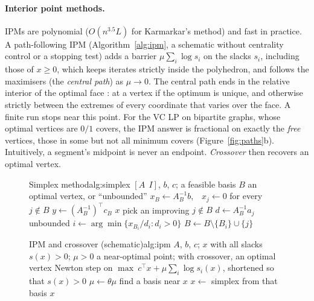 \paragraph{Interior point methods.} IPMs \cite{karmarkar1984} are polynomial ($O(n^{3.5}L)$ for Karmarkar's method) and fast in practice. A path-following IPM (Algorithm~\ref{alg:ipm}, a schematic without centrality control or a stopping test) adds a barrier $\mu\sum_i\log s_i$ on the slacks $s_i$, including those of $x\ge0$, which keeps iterates strictly inside the polyhedron, and follows the maximisers (the \emph{central path}) as $\mu\to0$. The central path ends in the relative interior of the optimal face \cite{guler1993}: at a vertex if the optimum is unique, and otherwise strictly between the extremes of every coordinate that varies over the face. A finite run stops near this point. For the VC LP on bipartite graphs, whose optimal vertices are $0/1$ covers, the IPM answer is fractional on exactly the \emph{free} vertices, those in some but not all minimum covers (Figure~\ref{fig:paths}b). Intuitively, a segment's midpoint is never an endpoint. \emph{Crossover} \cite{megiddo1991} then recovers an optimal vertex.

\begin{figure}[H]
  \begin{minipage}[t]{0.485\textwidth}
    \begin{algobox}{Simplex method}{alg:simplex}
      \Require $[A\ \ I]$, $b$, $c$; a feasible basis $B$
      \Ensure an optimal vertex, or ``unbounded''
      \Loop
        \State $x_B\gets A_B^{-1}b$,\ \ $x_j\gets 0$ for every $j\notin B$
        \State $y\gets (A_B^{-1})^{\top} c_B$ 
          \State \Return $x$ 
        \EndIf
        \State pick an improving $j\notin B$ 
        \State $d\gets A_B^{-1}a_j$ 
         \Return unbounded \EndIf
        \State $i\gets\arg\min\{x_{B_i}/d_i : d_i>0\}$ 
        \State $B\gets B\setminus\{B_i\}\cup\{j\}$ 
      \EndLoop
    \end{algobox}
  \end{minipage}\hfill
  \begin{minipage}[t]{0.485\textwidth}
    \begin{algobox}{IPM and crossover (schematic)}{alg:ipm}
      \Require $A$, $b$, $c$; $x$ with all slacks $s(x)>0$; $\mu>0$
      \Ensure a near-optimal point; with crossover, an optimal vertex
      \While{$\mu>\varepsilon$}
        \State Newton step on $\max\ c^\top x+\mu\textstyle\sum_i\log s_i(x)$,
        \Statex \hspace{\algorithmicindent}\hspace{\algorithmicindent}shortened so that $s(x)>0$
        \State $\mu\gets\theta\mu$ 
      \EndWhile
        \State find a basis near $x$ 
        \State $x\gets$ simplex from that basis 
      \EndIf
      \State \Return $x$
    \end{algobox}
  \end{minipage}
\end{figure}

